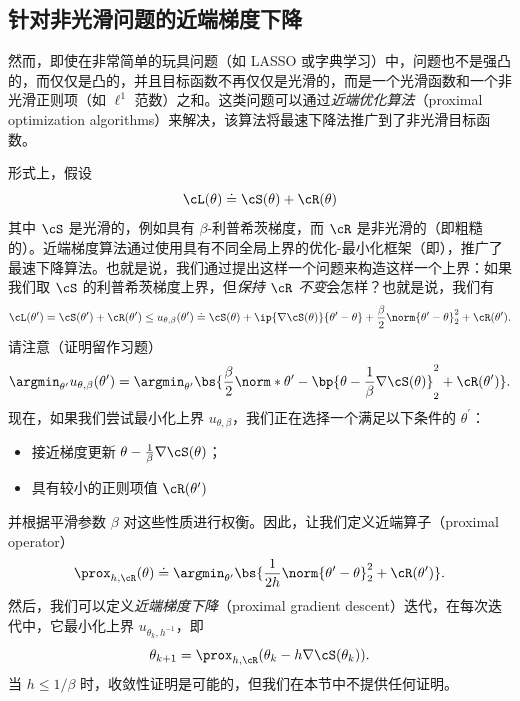 \documentclass[../../book-main_zh.tex]{subfiles}
\begin{document}
\subsection{针对非光滑问题的近端梯度下降}\label{subsec:pgd}

然而，即使在非常简单的玩具问题（如 LASSO 或字典学习）中，问题也不是强凸的，而仅仅是凸的，并且目标函数不再仅仅是光滑的，而是一个光滑函数和一个非光滑正则项（如 \(\ell^{1}\) 范数）之和。这类问题可以通过\textit{近端优化算法}（proximal optimization algorithms）来解决，该算法将最速下降法推广到了非光滑目标函数。

形式上，假设
\begin{equation}
    \cL(\theta) \doteq \cS(\theta) + \cR(\theta)
\end{equation}
其中 \(\cS\) 是光滑的，例如具有 \(\beta\)-利普希茨梯度，而 \(\cR\) 是非光滑的（即粗糙的）。近端梯度算法通过使用具有不同全局上界的优化-最小化框架（即），推广了最速下降算法。也就是说，我们通过提出这样一个问题来构造这样一个上界：如果我们取 \(\cS\) 的利普希茨梯度上界，但\textit{保持 \(\cR\) 不变}会怎样？也就是说，我们有
\begin{equation}
    \cL(\theta^{\prime}) = \cS(\theta^{\prime}) +
    \cR(\theta^{\prime}) \leq u_{\theta, \beta}(\theta^{\prime})
    \doteq \cS(\theta) + \ip{\nabla \cS(\theta)}{\theta^{\prime} -
    \theta} + \frac{\beta}{2}\norm{\theta^{\prime} - \theta}_{2}^{2}
    + \cR(\theta^{\prime}).
\end{equation}
请注意（证明留作习题）
\begin{equation}
    \argmin_{\theta^{\prime}}u_{\theta, \beta}(\theta^{\prime}) =
    \argmin_{\theta^{\prime}}\bs{\frac{\beta}{2}\norm*{\theta^{\prime}
        - \bp{\theta - \frac{1}{\beta}\nabla \cS(\theta)}}_{2}^{2} +
    \cR(\theta^{\prime})}.
\end{equation}
现在，如果我们尝试最小化上界 \(u_{\theta, \beta}\)，我们正在选择一个满足以下条件的 \(\theta^{\prime}\)：
\begin{itemize}
    \item 接近梯度更新 \(\theta - \frac{1}{\beta}\nabla \cS(\theta)\)；
    \item 具有较小的正则项值 \(\cR(\theta^{\prime})\)
\end{itemize}
并根据平滑参数 \(\beta\) 对这些性质进行权衡。因此，让我们定义近端算子（proximal operator）
\begin{equation}
    \prox_{h, \cR}(\theta) \doteq
    \argmin_{\theta^{\prime}}\bs{\frac{1}{2h}\norm{\theta^{\prime} -
    \theta}_{2}^{2} + \cR(\theta^{\prime})}.
\end{equation}
然后，我们可以定义\textit{近端梯度下降}（proximal gradient descent）迭代，在每次迭代中，它最小化上界 \(u_{\theta_{k}, h^{-1}}\)，即
\begin{equation}
    \theta_{k + 1} = \prox_{h, \cR}(\theta_{k} - h\nabla \cS(\theta_{k})).
\end{equation}
当 \(h \leq 1/\beta\) 时，收敛性证明是可能的，但我们在本节中不提供任何证明。
\end{document}
